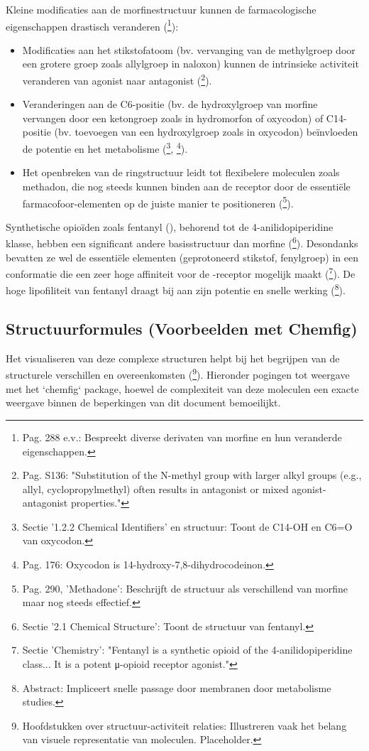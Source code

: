 \documentclass[11pt, a4paper]{report} %
\begin{document}
Kleine modificaties aan de morfinestructuur kunnen de farmacologische eigenschappen drastisch veranderen (\cite{Gupta2010ChemistryOpioids}\footnote{Pag. 288 e.v.: Bespreekt diverse derivaten van morfine en hun veranderde eigenschappen.}):
\begin{itemize}
    \item Modificaties aan het stikstofatoom (bv. vervanging van de methylgroep door een grotere groep zoals allylgroep in naloxon) kunnen de intrinsieke activiteit veranderen van agonist naar antagonist (\cite{Trescot2008OpioidPharm}\footnote{Pag. S136: "Substitution of the N-methyl group with larger alkyl groups (e.g., allyl, cyclopropylmethyl) often results in antagonist or mixed agonist-antagonist properties."}).
    \item Veranderingen aan de C6-positie (bv. de hydroxylgroep van morfine vervangen door een ketongroep zoals in hydromorfon of oxycodon) of C14-positie (bv. toevoegen van een hydroxylgroep zoals in oxycodon) beïnvloeden de potentie en het metabolisme (\cite{PubChemOxycodone}\footnote{Sectie '1.2.2 Chemical Identifiers' en structuur: Toont de C14-OH en C6=O van oxycodon.}, \cite{Riley2008OxycodoneReview}\footnote{Pag. 176: Oxycodon is 14-hydroxy-7,8-dihydrocodeinon.}).
    \item Het openbreken van de ringstructuur leidt tot flexibelere moleculen zoals methadon, die nog steeds kunnen binden aan de receptor door de essentiële farmacofoor-elementen op de juiste manier te positioneren (\cite{Gupta2010ChemistryOpioids}\footnote{Pag. 290, 'Methadone': Beschrijft de structuur als verschillend van morfine maar nog steeds effectief.}).
\end{itemize}
Synthetische opioïden zoals fentanyl (), behorend tot de 4-anilidopiperidine klasse, hebben een significant andere basisstructuur dan morfine (\cite{PubChemfentanyl}\footnote{Sectie '2.1 Chemical Structure': Toont de structuur van fentanyl.}). Desondanks bevatten ze wel de essentiële elementen (geprotoneerd stikstof, fenylgroep) in een conformatie die een zeer hoge affiniteit voor de \textmu-receptor mogelijk maakt (\cite{EMCDDAFentanylProfile}\footnote{Sectie 'Chemistry': "Fentanyl is a synthetic opioid of the 4-anilidopiperidine class... It is a potent μ-opioid receptor agonist."}). De hoge lipofiliteit van fentanyl draagt bij aan zijn potentie en snelle werking (\cite{Labroo1997FentanylMetabolism}\footnote{Abstract: Impliceert snelle passage door membranen door metabolisme studies.}).

\subsection{Structuurformules (Voorbeelden met Chemfig)}
Het visualiseren van deze complexe structuren helpt bij het begrijpen van de structurele verschillen en overeenkomsten (\cite{SomeOrganicChemistryTextbook}\footnote{Hoofdstukken over structuur-activiteit relaties: Illustreren vaak het belang van visuele representatie van moleculen. Placeholder.}). Hieronder pogingen tot weergave met het `chemfig` package, hoewel de complexiteit van deze moleculen een exacte weergave binnen de beperkingen van dit document bemoeilijkt.
\end{document}
